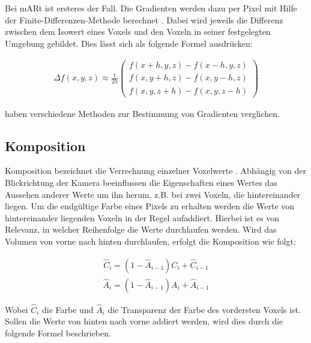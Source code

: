 Bei mARt ist ersteres der Fall. Die Gradienten werden dazu per Pixel mit Hilfe der Finite-Differenzen-Methode berechnet \cite{Hadwiger06}.
Dabei wird jeweils die Differenz zwischen dem Isowert eines Voxels und den Voxeln in seiner festgelegten Umgebung gebildet. Dies lässt sich als folgende Formel ausdrücken: 

\begin{align}
\Delta f(x,y,z)\approx \frac{1}{2h}
\left ( \begin{matrix}
f(x + h, y, z) - f(x - h, y, z)\\ 
f(x, y + h, z) - f(x, y - h, z)\\ 
f(x, y, z + h) - f(x, y, z - h)
\end{matrix} \right )
\end{align}


\cite{Correa11} haben verschiedene Methoden zur Bestimmung von Gradienten verglichen.

\subsection{Komposition}

Komposition bezeichnet die Verrechnung einzelner Voxelwerte \cite{Fernando04}. Abhängig von der Blickrichtung der Kamera beeinflussen die Eigenschaften eines Wertes das Aussehen anderer Werte um ihn herum, z.B. bei zwei Voxeln, die hintereinander liegen. Um die endgültige Farbe eines Pixels zu erhalten werden die Werte von hintereinander liegenden Voxeln in der Regel aufaddiert. Hierbei ist es von Relevanz, in welcher Reihenfolge die Werte durchlaufen werden. Wird das Volumen von vorne nach hinten durchlaufen, erfolgt die Komposition wie folgt:

\begin{align}
\hat{C}_{i}=(1-\hat{A}_{i-1})C_{i}+\hat{C}_{i-1}
\end{align}
\begin{align}
\hat{A}_{i}=(1-\hat{A}_{i-1})A_{i}+\hat{A}_{i-1}
\end{align}


Wobei $\hat{C}_{i}$ die Farbe und $\hat{A}_{i}$ die Transparenz der Farbe des vordersten Voxels ist.
Sollen die Werte von hinten nach vorne addiert werden, wird dies durch die folgende Formel beschrieben.

